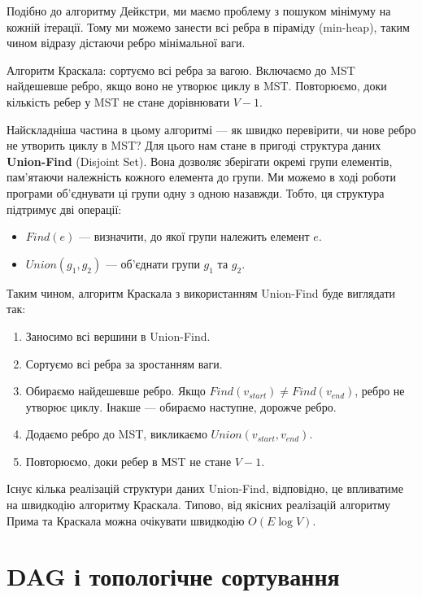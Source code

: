 \documentclass[12pt,a4paper]{report}
\begin{document}
Подібно до алгоритму Дейкстри, ми маємо проблему з пошуком мінімуму на кожній ітерації. Тому ми можемо занести всі ребра в піраміду (min-heap), таким чином відразу дістаючи ребро мінімальної ваги.



Алгоритм Краскала: сортуємо всі ребра за вагою. Включаємо до MST найдешевше ребро, якщо воно не утворює циклу в MST. Повторюємо, доки кількість ребер у MST не стане дорівнювати \(V - 1\).

Найскладніша частина в цьому алгоритмі --- як швидко перевірити, чи нове ребро не утворить циклу в MST? Для цього нам стане в пригоді структура даних \textbf{Union-Find} (Disjoint Set). Вона дозволяє зберігати окремі групи елементів, пам’ятаючи належність кожного елемента до групи. Ми можемо в ході роботи програми об’єднувати ці групи одну з одною назавжди. Тобто, ця структура підтримує дві операції:

\begin{itemize}
    \item \(Find(e)\) --- визначити, до якої групи належить елемент \(e\).
    \item \(Union(g_1, g_2)\) --- об’єднати групи \(g_1\) та \(g_2\).
\end{itemize}

Таким чином, алгоритм Краскала з використанням Union-Find буде виглядати так:

\begin{enumerate}
    \item Заносимо всі вершини в Union-Find.
    \item Сортуємо всі ребра за зростанням ваги.
    \item Обираємо найдешевше ребро. Якщо \(Find(v_{start}) \neq Find(v_{end})\), ребро не утворює циклу. Інакше --- обираємо наступне, дорожче ребро.
    \item Додаємо ребро до MST, викликаємо \(Union(v_{start}, v_{end})\).
    \item Повторюємо, доки ребер в МST не стане \(V - 1\).
\end{enumerate}



Існує кілька реалізацій структури даних Union-Find, відповідно, це впливатиме на швидкодію алгоритму Краскала. Типово, від якісних реалізацій алгоритму Прима та Краскала можна очікувати швидкодію \(O(E \log V)\).



\section{DAG і топологічне сортування}
\end{document}
